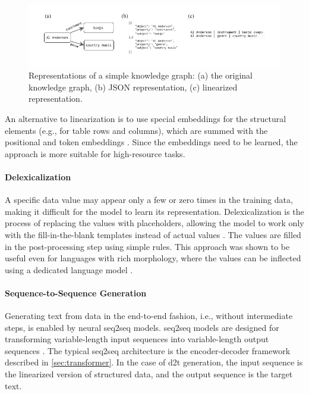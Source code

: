 {\begin{figure}[h]
    \centering
    \includegraphics[width=\textwidth]{img/linearization.pdf}

    \caption{Representations of a simple knowledge graph: (a) the original knowledge graph, (b) JSON representation, (c) linearized representation.}\label{fig:linearization}

\end{figure}

An alternative to linearization is to use special embeddings for the structural elements (e.g., for table rows and columns), which are summed with the positional and token embeddings \cite{wang2021tuta,yangTableFormerRobustTransformer2022}. Since the embeddings need to be learned, the approach is more suitable for high-resource tasks.

\paragraph{Delexicalization} A specific data value may appear only a few or zero times in the training data, making it difficult for the model to learn its representation. Delexicalization is the process of replacing the values with placeholders, allowing the model to work only with the fill-in-the-blank templates instead of actual values \cite{oh2000stochastic,mairesse2010phrase,wen2015semantically,dusekSequencetoSequenceGenerationSpoken2016}. The values are filled in the post-processing step using simple rules. This approach was shown to be useful even for languages with rich morphology, where the values can be inflected using a dedicated language model \cite{duvsek2019neural}.

\paragraph{Sequence-to-Sequence Generation} Generating text from data in the end-to-end fashion, i.e., without intermediate steps, is enabled by neural \ac{seq2seq} models. \Ac{seq2seq} models are designed for transforming variable-length input sequences into variable-length output sequences \cite{cho2014learning,sutskever2014sequence}. The typical \ac{seq2seq} architecture is the encoder-decoder framework described in \autoref{sec:transformer}. In the case of \ac{d2t} generation, the input sequence is the linearized version of structured data, and the output sequence is the target text.

}
